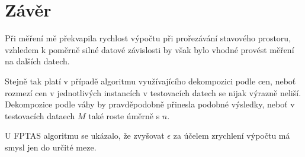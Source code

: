 \documentclass[11pt]{article}
\begin{document}
\section{Závěr}

Při měření mě překvapila rychlost výpočtu při prořezávání stavového prostoru, vzhledem k poměrně silné datové závislosti by však bylo vhodné provést měření na dalších datech. 

Stejně tak platí v případě algoritmu využívajícího dekompozici podle cen, neboť rozmezí cen v jednotlivých instancích v testovacích datech se nijak výrazně neliší. Dekompozice podle váhy by pravděpodobně přinesla podobné výsledky, neboť v testovacích dataech $M$ také roste úměrně s $n$.

U FPTAS algoritmu se ukázalo, že zvyšovat $\epsilon$ za účelem zrychlení výpočtu má smysl jen do určité meze.



\end{document}
